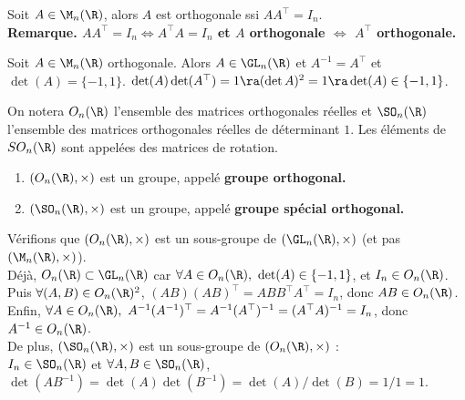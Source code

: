 \documentclass[11pt]{article}
\begin{document}
\begin{defi}{}{}
    Soit $A\in\M_n(\R)$, alors $A$ est orthogonale ssi $AA^\top=I_n$.\\
    \bf{Remarque.} $AA^\top=I_n \iff A^\top A=I_n$ et $A$ orthogonale $\iff$ $A^\top$ orthogonale.
\end{defi}

\vspace*{-0.7cm}

\begin{prop}{}{}
    Soit $A\in\M_n(\R)$ orthogonale. Alors $A\in\GL_n(\R)$ et $A^{-1}=A^\top$ et $\det(A)=\{-1,1\}$.
    \tcblower
    $\det(A)\det(A^\top)=1 \ra (\det A)^2 = 1 \ra \det(A)\in\{-1,1\}$.
\end{prop}

\vspace*{-0.7cm}

\begin{nota}{}{}
    On notera $O_n(\R)$ l'ensemble des matrices orthogonales réelles et $\SO_n(\R)$ l'ensemble des matrices orthogonales réelles de déterminant $1$. Les éléments de $SO_n(\R)$ sont appelées des matrices de rotation.
\end{nota}

\vspace*{-0.7cm}

\begin{prop}{}{}
    \begin{enumerate}
        \item $(O_n(\R),\times)$ est un groupe, appelé \bf{groupe orthogonal}.
        \item $(\SO_n(\R),\times)$ est un groupe, appelé \bf{groupe spécial orthogonal}.
    \end{enumerate}
    \tcblower
    Vérifions que $(O_n(\R),\times)$ est un sous-groupe de $(\GL_n(\R),\times)$ (et pas $(\M_n(\R), \times)$).\\
    Déjà, $O_n(\R)\subset \GL_n(\R)$ car $\forall A \in O_n(\R), ~ \det(A)\in\{-1,1\}$, et $I_n\in O_n(\R)$.\\
    Puis $\forall (A,B) \in O_n(\R)^2$, $(AB)(AB)^\top=ABB^\top A^\top=I_n$, donc $AB\in O_n(\R)$.\\
    Enfin, $\forall A \in O_n(\R), ~ A^{-1}(A^{-1})^\top=A^{-1}(A^\top)^{-1}=(A^\top A)^{-1}=I_n$, donc $A^{-1}\in O_n(\R)$.\\
    De plus, $(\SO_n(\R),\times)$ est un sous-groupe de $(O_n(\R),\times)$ :\\
    $I_n\in \SO_n(\R)$ et $\forall A,B \in \SO_n(\R)$, $\det(AB^{-1})=\det(A)\det(B^{-1})=\det(A)/\det(B)=1/1=1$.
\end{prop}
\end{document}
